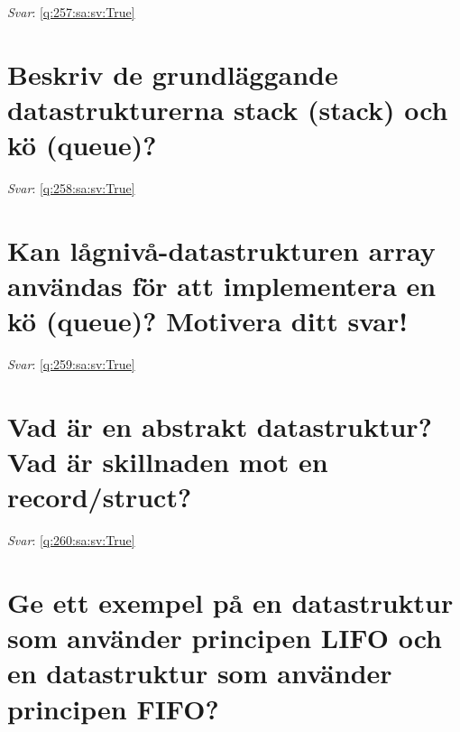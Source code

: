 \documentclass[a4paper,11pt,oneside]{book}
\begin{document}
\begin{sloppypar}
\textit{Svar}: \autoref{q:257:sa:sv:True}



\section{Beskriv de grundl\"aggande datastrukturerna stack (stack) och k\"o (queue)?}

\label{q:258:sa:sv:False}

\vspace{2cm}

\noindent\makebox[\textwidth]{\hrulefill}

\vspace{1cm}

\textit{Svar}: \autoref{q:258:sa:sv:True}



\section{Kan l\r{a}gniv\r{a}-datastrukturen array anv\"andas f\"or att implementera en k\"o (queue)? Motivera ditt svar!}

\label{q:259:sa:sv:False}

\vspace{2cm}

\noindent\makebox[\textwidth]{\hrulefill}

\vspace{1cm}

\textit{Svar}: \autoref{q:259:sa:sv:True}



\section{Vad \"ar en abstrakt datastruktur? Vad \"ar skillnaden mot en record/struct?}

\label{q:260:sa:sv:False}

\vspace{2cm}

\noindent\makebox[\textwidth]{\hrulefill}

\vspace{1cm}

\textit{Svar}: \autoref{q:260:sa:sv:True}



\section{Ge ett exempel p\r{a} en datastruktur som anv\"ander principen LIFO och en datastruktur som anv\"ander principen FIFO?}


\end{sloppypar}
\end{document}
